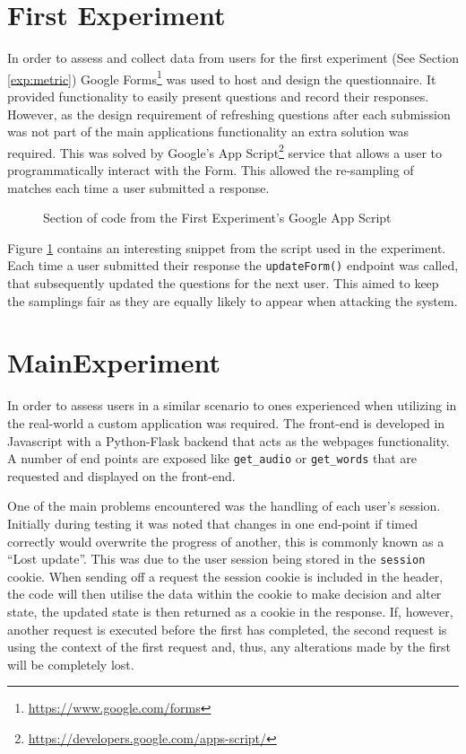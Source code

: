 \section{First Experiment}
In order to assess and collect data from users for the first experiment (See Section \ref{exp:metric}) Google Forms\footnote{\url{https://www.google.com/forms}} was used to host and design the questionnaire. It provided functionality to easily present questions and record their responses. However, as the design requirement of refreshing questions after each submission was not part of the main applications functionality an extra solution was required. This was solved by Google's App Script\footnote{\url{https://developers.google.com/apps-script/}} service that allows a user to programmatically interact with the Form. This allowed the re-sampling of matches each time a user submitted a response.

\begin{figure}[!h]
  \centering
  
\caption{Section of code from the First Experiment's Google App Script}
\label{fig:GoogleAppScript}
\end{figure}

Figure \ref{fig:GoogleAppScript} contains an interesting snippet from the script used in the experiment. Each time a user submitted their response the \verb|updateForm()| endpoint was called, that subsequently updated the questions for the next user. This aimed to keep the samplings fair as they are equally likely to appear when attacking the system.

\newpage

\section{MainExperiment}
In order to assess users in a similar scenario to ones experienced when utilizing \pep in the real-world a custom application was required. The front-end is developed in Javascript with a Python-Flask backend that acts as the webpages functionality. A number of end points are exposed like \verb|get_audio| or \verb|get_words| that are requested and displayed on the front-end.

One of the main problems encountered was the handling of each user's session. Initially during testing it was noted that changes in one end-point if timed correctly would overwrite the progress of another, this is commonly known as a ``Lost update''. This was due to the user session being stored in the \verb|session| cookie. When sending off a request the session cookie is included in the header, the code will then utilise the data within the cookie to make decision and alter state, the updated state is then returned as a cookie in the response. If, however, another request is executed before the first has completed, the second request is using the context of the first request and, thus, any alterations made by the first will be completely lost.

